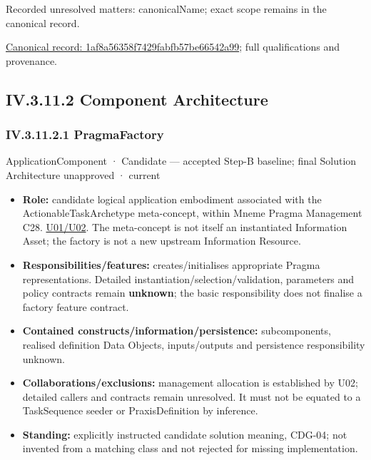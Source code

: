 {\small Recorded unresolved matters: canonicalName; exact scope remains in the canonical record.}\par
{\footnotesize \href{../../../../continuum/application/application-component/1af8a56358f7429fabfb57be66542a99.md}{Canonical record: 1af8a56358f7429fabfb57be66542a99}; full qualifications and provenance.}\par
\subsection*{IV.3.11.2 Component Architecture}
\label{navigation:IV.3.11.2}

\subsubsection*{IV.3.11.2.1 PragmaFactory}
\label{navigation:IV.3.11.2.1}

\label{element:75e77d8dfd1d4870aa6151485d28d1dd}
{\small ApplicationComponent · Candidate — accepted Step-B baseline; final Solution Architecture unapproved · current}\par

\begin{itemize}


\item \textbf{Role:} candidate logical application embodiment associated with the
  ActionableTaskArchetype meta-concept, within Mneme Pragma Management C28.
  \href{\detokenize{../../../../../docs/markdown/05-information-systems-architecture/sources.md#u02}}{U01/U02}. The meta-concept is not itself an instantiated
  Information Asset; the factory is not a new upstream Information Resource.

\item \textbf{Responsibilities/features:} creates/initialises appropriate Pragma
  representations. Detailed instantiation/selection/validation, parameters and
  policy contracts remain \textbf{unknown}; the basic responsibility does not finalise
  a factory feature contract.

\item \textbf{Contained constructs/information/persistence:} subcomponents, realised
  definition Data Objects, inputs/outputs and persistence responsibility unknown.

\item \textbf{Collaborations/exclusions:} management allocation is established by U02;
  detailed callers and contracts remain unresolved. It must not be equated to a
  TaskSequence seeder or PraxisDefinition by inference.

\item \textbf{Standing:} explicitly instructed candidate solution meaning, CDG-04; not
  invented from a matching class and not rejected for missing implementation.

\end{itemize}

